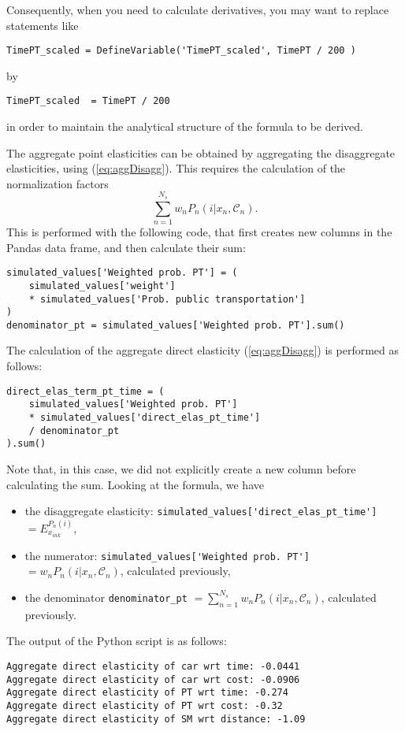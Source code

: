 \documentclass[12pt,a4paper]{article}
\newcommand{\req}[1]{(\ref{#1})}
\newcommand{\C}{\mathcal{C}}
\begin{document}
Consequently, when you need to calculate derivatives, you may want to
replace statements like
\begin{lstlisting}
TimePT_scaled = DefineVariable('TimePT_scaled', TimePT / 200 )
\end{lstlisting}
by
\begin{lstlisting}
TimePT_scaled  = TimePT / 200
\end{lstlisting}
in order to maintain the analytical structure of the formula to be derived.

The aggregate point elasticities can be obtained by aggregating the
disaggregate elasticities, using \req{eq:aggDisagg}. This requires the
calculation of the normalization factors
\begin{equation}
\sum_{n=1}^{N_s} w_n P_n(i|x_n, \C_n).
\end{equation}
This is performed with the following code, that first creates new
columns in the Pandas data frame, and then calculate their sum:
\begin{lstlisting}
simulated_values['Weighted prob. PT'] = (
    simulated_values['weight']
    * simulated_values['Prob. public transportation']
)
denominator_pt = simulated_values['Weighted prob. PT'].sum()
\end{lstlisting}

The calculation of the aggregate direct elasticity \req{eq:aggDisagg}
is performed as follows:
\begin{lstlisting}
direct_elas_term_pt_time = (
    simulated_values['Weighted prob. PT']
    * simulated_values['direct_elas_pt_time']
    / denominator_pt
).sum()
\end{lstlisting}
Note that, in this case, we did not explicitly create a new column
before calculating the sum. Looking at the formula, we have
\begin{itemize}
  \item the disaggregate elasticity: \lstinline+simulated_values['direct_elas_pt_time']+ $=E_{x_{ink}}^{P_n(i)}$,
  \item the numerator: \lstinline+simulated_values['Weighted prob. PT']+ $=w_n P_n(i|x_n,\C_n)$, calculated previously,
  \item the denominator \lstinline+denominator_pt+ $=
    \sum_{n=1}^{N_s} w_n P_n(i|x_n, \C_n)$, calculated previously.
\end{itemize}

The output of the Python script is as follows:
\begin{lstlisting}
Aggregate direct elasticity of car wrt time: -0.0441
Aggregate direct elasticity of car wrt cost: -0.0906
Aggregate direct elasticity of PT wrt time: -0.274
Aggregate direct elasticity of PT wrt cost: -0.32
Aggregate direct elasticity of SM wrt distance: -1.09
\end{lstlisting}
\end{document}
